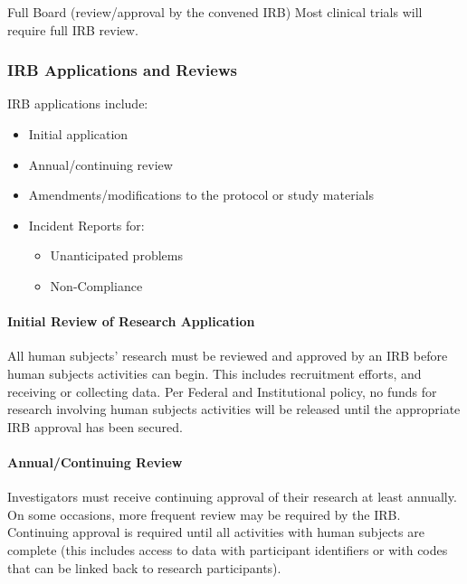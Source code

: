 \documentclass[]{book}
\providecommand{\tightlist}{%
  \setlength{\itemsep}{0pt}\setlength{\parskip}{0pt}}
\begin{document}
Full Board (review/approval by the convened IRB) Most clinical trials
will require full IRB review.

\subsubsection{IRB Applications and
Reviews}\label{irb-applications-and-reviews}

IRB applications include:

\begin{itemize}
\tightlist
\item
  Initial application
\item
  Annual/continuing review
\item
  Amendments/modifications to the protocol or study materials
\item
  Incident Reports for:

  \begin{itemize}
  \tightlist
  \item
    Unanticipated problems
  \item
    Non-Compliance
  \end{itemize}
\end{itemize}

\paragraph{Initial Review of Research
Application}\label{initial-review-of-research-application}

All human subjects' research must be reviewed and approved by an IRB
before human subjects activities can begin. This includes recruitment
efforts, and receiving or collecting data. Per Federal and Institutional
policy, no funds for research involving human subjects activities will
be released until the appropriate IRB approval has been secured.

\paragraph{Annual/Continuing Review}\label{annualcontinuing-review}

Investigators must receive continuing approval of their research at
least annually. On some occasions, more frequent review may be required
by the IRB. Continuing approval is required until all activities with
human subjects are complete (this includes access to data with
participant identifiers or with codes that can be linked back to
research participants).
\end{document}
